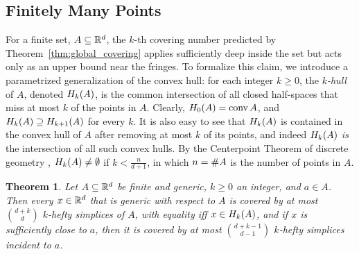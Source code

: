 \documentclass[10pt,a4paper]{article}
\newtheorem{theorem}{Theorem}[section]
\newcommand {\mm}[1] {\ifmmode{#1}\else{\mbox{\(#1\)}}\fi}
\theoremstyle{plain}
\newcommand{\Rspace}        {\mm{{\mathbb R}}}
\newcommand{\Hull}[2]       {\mm{{H}_{#1}{({#2})}}}
\newcommand{\card}[1]       {\mm{{\#}{#1}}}
\newcommand{\conv}[1]       {\mm{{\rm conv\,}{#1}}}
\begin{document}
\subsection{Finitely Many Points}
\label{sec:2.4}
For a finite set, $A \subseteq \Rspace^d$, the $k$-th covering number predicted by Theorem~\ref{thm:global_covering} applies sufficiently deep inside the set but acts only as an upper bound near the fringes.
To formalize this claim, we introduce a parametrized generalization of the convex hull: for each integer $k \geq 0$, the \emph{$k$-hull} of $A$, denoted $\Hull{k}{A}$, is the common intersection of all closed half-spaces that miss at most $k$ of the points in $A$.
Clearly, $\Hull{0}{A} = \conv{A}$, and $\Hull{k}{A} \supseteq \Hull{k+1}{A}$ for every $k$.
It is also easy to see that $\Hull{k}{A}$ is contained in the convex hull of $A$ after removing at most $k$ of its points, and indeed $\Hull{k}{A}$ \emph{is} the intersection of all such convex hulls.
By the Centerpoint Theorem of discrete geometry \cite[Section~4.1]{Ede87}, $\Hull{k}{A} \neq \emptyset$ if $k < \frac{n}{d+1}$, in which $n = \card{A}$ is the number of points in $A$.
\begin{theorem}
  \label{thm:covering_for_finite_sets}
  Let $A \subseteq \Rspace^d$ be finite and generic, $k \geq 0$ an integer, and $a \in A$.
  Then every $x \in \Rspace^d$ that is generic with respect to $A$ is covered by at most $\binom{d+k}{d}$ $k$-hefty simplices of $A$, with equality iff $x \in \Hull{k}{A}$, and if $x$ is sufficiently close to $a$, then it is covered by at most $\binom{d+k-1}{d-1}$ $k$-hefty simplices incident to $a$.
\end{theorem}
\end{document}
